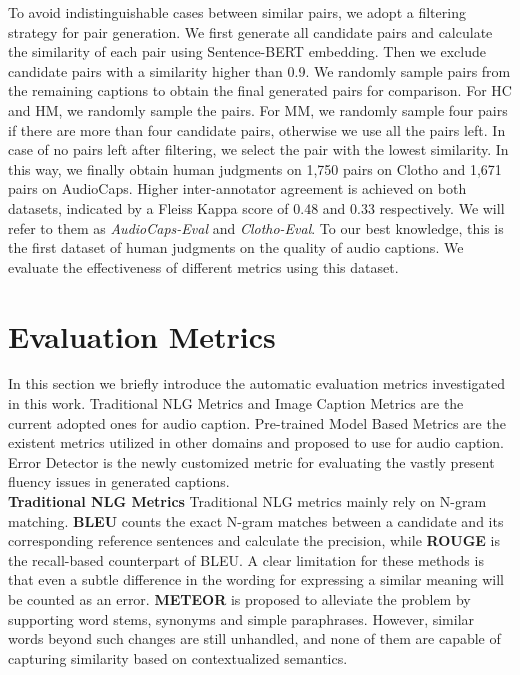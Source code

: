 \documentclass{article}
\begin{document}
To avoid indistinguishable cases between similar pairs, we adopt a filtering strategy for pair generation.
We first generate all candidate pairs and calculate the similarity of each pair using Sentence-BERT embedding. 
Then we exclude candidate pairs with a similarity higher than 0.9.
We randomly sample pairs from the remaining captions to obtain the final generated pairs for comparison.
For HC and HM, we randomly sample the pairs.
For MM, we randomly sample four pairs if there are more than four candidate pairs, otherwise we use all the pairs left.
In case of no pairs left after filtering, we select the pair with the lowest similarity.
In this way, we finally obtain human judgments on 1,750 pairs on Clotho and 1,671 pairs on AudioCaps.
Higher inter-annotator agreement is achieved on both datasets, indicated by a Fleiss Kappa score of 0.48 and 0.33 respectively. We will refer to them as \textit{AudioCaps-Eval} and \textit{Clotho-Eval}. 
To our best knowledge, this is the first dataset of human judgments on the quality of audio captions.
We evaluate the effectiveness of different metrics using this dataset.

\section{Evaluation Metrics}
In this section we briefly introduce the automatic evaluation metrics investigated in this work.
Traditional NLG Metrics and Image Caption Metrics are the current adopted ones for audio caption. Pre-trained Model Based Metrics are the existent metrics utilized in other domains and proposed to use for audio caption. Error Detector is the newly customized metric for evaluating the vastly present fluency issues in generated captions.\\

\noindent\textbf{Traditional NLG Metrics} 
\quad   Traditional NLG metrics mainly rely on N-gram matching. \textbf{BLEU} \cite{papineni2002bleu} counts the exact N-gram matches between a candidate and its corresponding reference sentences and calculate the precision, while \textbf{ROUGE} \cite{lin2004rouge} is the recall-based counterpart of BLEU. A clear limitation for these methods is that even a subtle difference in the wording for expressing a similar meaning will be counted as an error. \textbf{METEOR} \cite{banerjee2005meteor} is proposed to alleviate the problem by supporting word stems, synonyms and simple paraphrases. However, similar words beyond such changes are still unhandled, and none of them are capable of capturing similarity based on contextualized semantics.
\end{document}

